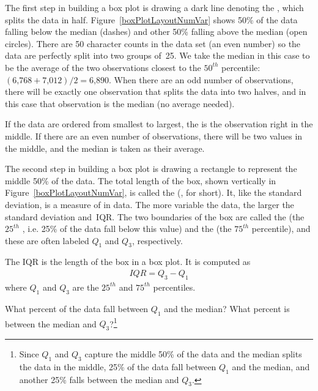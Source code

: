 The first step in building a box plot is drawing a dark line denoting the , which splits the data in half. Figure~\ref{boxPlotLayoutNumVar} shows 50\% of the data falling below the median (dashes) and other 50\% falling above the median (open circles). There are 50 character counts in the data set (an even number) so the data are perfectly split into two groups of~25. We take the median in this case to be the average of the two observations closest to the $50^{th}$ percentile: $(\text{6,768} + \text{7,012}) / 2 = \text{6,890}$. When there are an odd number of observations, there will be exactly one observation that splits the data into two halves, and in this case that observation is the median (no average needed).

\begin{termBox}{
If the data are ordered from smallest to largest, the  is the observation right in the middle. If there are an even number of observations, there will be two values in the middle, and the median is taken as their average.}
\end{termBox}

The second step in building a box plot is drawing a rectangle to represent the middle 50\% of the data. The total length of the box, shown vertically in Figure~\ref{boxPlotLayoutNumVar}, is called the  (, for short). It, like the standard deviation, is a measure of  in data. The more variable the data, the larger the standard deviation and~IQR. The two boundaries of the box are called the   (the $25^{th}$ , i.e. 25\% of the data fall below this value) and the   (the $75^{th}$ percentile), and these are often labeled $Q_1$  and $Q_3$, respectively.

\begin{termBox}{
The IQR is the length of the box in a box plot. It is computed as
\begin{eqnarray*}
IQR = Q_3 - Q_1
\end{eqnarray*}
where $Q_1$ and $Q_3$ are the $25^{th}$ and $75^{th}$ percentiles.}
\end{termBox}

\begin{exercise}
What percent of the data fall between $Q_1$ and the median? What percent is between the median and $Q_3$?\footnote{Since $Q_1$ and $Q_3$ capture the middle 50\% of the data and the median splits the data in the middle, 25\% of the data fall between $Q_1$ and the median, and another 25\% falls between the median and $Q_3$.}
\end{exercise}

